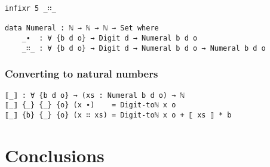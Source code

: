\documentclass[12pt, a4paper]{article}
\begin{document}
\begin{lstlisting}
infixr 5 _∷_

data Numeral : ℕ → ℕ → ℕ → Set where
    _∙  : ∀ {b d o} → Digit d → Numeral b d o
    _∷_ : ∀ {b d o} → Digit d → Numeral b d o → Numeral b d o
\end{lstlisting}



\subsubsection{Converting to natural numbers}

\begin{lstlisting}
⟦_⟧ : ∀ {b d o} → (xs : Numeral b d o) → ℕ
⟦_⟧ {_} {_} {o} (x ∙)    = Digit-toℕ x o
⟦_⟧ {b} {_} {o} (x ∷ xs) = Digit-toℕ x o + ⟦ xs ⟧ * b
\end{lstlisting}


\section{Conclusions}\label{conclusions}



\end{document}

